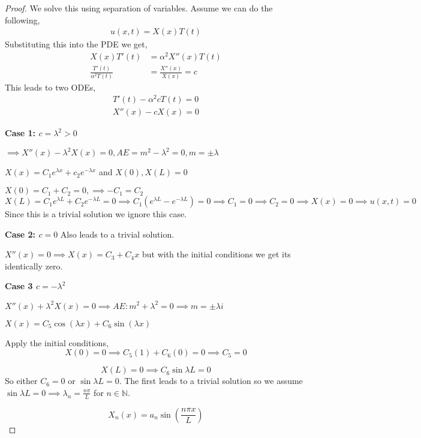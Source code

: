 \documentclass[oneside,11pt,pdftex,final]{book}%
\numberwithin{equation}{section}
\numberwithin{section}{chapter}
\numberwithin{equation}{chapter}
\newcommand{\N}{\mathbb{N}}
\begin{document}
\begin{proof}
	We solve this using separation of variables. Assume we can do the following,
	\begin{align*}
		u(x,t)=X(x)T(t)
	\end{align*}
	Substituting this into the PDE we get,
	\begin{align*}
		X(x)T'(t)&=\alpha^2 X''(x)T(t)\\
		\frac{T'(t)}{\alpha^2 T(t)}&=\frac{X''(x)}{X(x)}=c
	\end{align*}
	This leads to two ODEs,
	\begin{align}
		T'(t)-\alpha^2cT(t)=0\\
		X''(x)-cX(x)=0
	\end{align}
	
	\textbf{Case 1: $ c=\lambda^2>0 $ }
	
	$ \implies X''(x) - \lambda^2 X(x)=0, AE=m^2-\lambda^2=0, m=\pm \lambda $
	
	$ X(x) =C_1e^{\lambda x}+c_2 e^{-\lambda x}$ and $ X(0) , X(L)=0$
	
	$ X(0) =C_1+C_2=0,\implies -C_1=C_2 $
	$ X(L)=C_1e^{\lambda L}+C_2 e^{-\lambda L}=0 \implies C_1(e^{\lambda L}-e^{-\lambda L})=0 \implies C_1=0\implies C_2=0 \implies X(x)=0\implies u(x,t)=0 $ Since this is a trivial solution we ignore this case.
	
	\textbf{Case 2: $ c=0 $} Also leads to a trivial solution.
	
	$ X''(x)=0 \implies X(x)=C_3+C_4x $ but with the initial conditions we get its identically zero.
	
	\textbf{Case 3 $ c=-\lambda^2 $}
	
	$ X''(x)+\lambda^2X(x)=0 \implies AE: m^2+\lambda^2=0 \implies m=\pm \lambda i$
	
	$ X(x)=C_5 \cos (\lambda x)+C_6 \sin(\lambda x) $
	
	Apply the initial conditions,
	\[ X(0)=0 \implies C_5(1)+C_6(0)=0 \implies C_5=0 \]
	
	\[ X(L)=0\implies C_6 \sin \lambda L=0 \]
	So either $ C_6=0 $ or $ \sin \lambda L=0 $. The first leads to a trivial solution so we assume $ \sin \lambda L=0 \implies \lambda_n=\frac{n \pi }{L} $ for $ n \in \N $.
	
	$$ X_n(x)=a_n \sin \left( \frac{n\pi x}{L} \right) $$
	

\end{proof}
\end{document}
